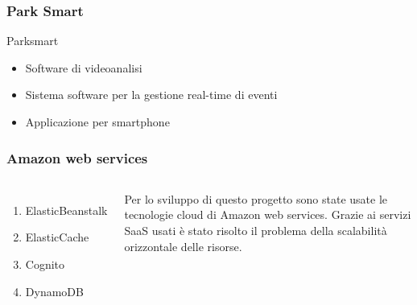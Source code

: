 \documentclass{beamer}
\begin{document}
\begin{frame}
\frametitle{Park Smart}
Parksmart 
\begin{itemize}
\item Software di videoanalisi
\item Sistema software per la gestione real-time di eventi
\item Applicazione per smartphone
\end{itemize}
\end{frame}


\begin{frame}
\frametitle{Amazon web services}
\begin{columns}[c] 


\begin{enumerate}
\item ElasticBeanstalk
\item ElasticCache
\item Cognito
\item DynamoDB
\end{enumerate}

Per lo sviluppo di questo progetto sono state usate le tecnologie cloud di Amazon web services. Grazie ai servizi SaaS usati \`e stato risolto il problema della scalabilit\`a orizzontale delle risorse.

\end{columns}
\end{frame}


\end{document}
